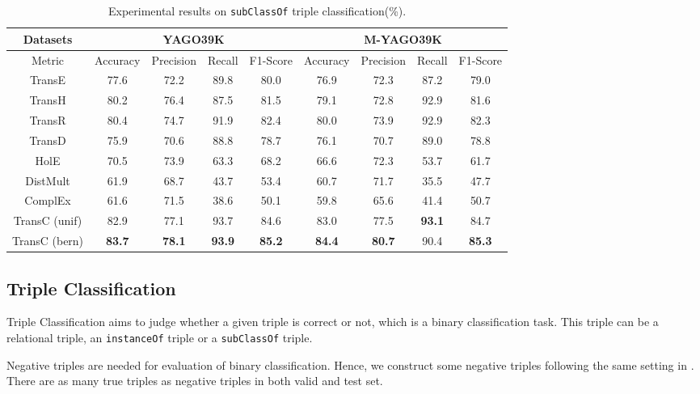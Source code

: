 \documentclass[11pt,a4paper]{article}
\begin{document}
  \begin{table*}[!htb]
    \centering
    \setlength{\belowcaptionskip}{-1pt}
    \small
        \begin{tabular}{c|cccc|cccc}
        \hline
        Datasets & \multicolumn{4}{c|}{YAGO39K} & \multicolumn{4}{c}{M-YAGO39K}\\
        \hline
        \multirow{1}{*}{Metric} & Accuracy & Precision & Recall & F1-Score & Accuracy & Precision & Recall & F1-Score \\
        \hline
        TransE  & 77.6  & 72.2  & 89.8   & 80.0 & 76.9  & 72.3  & 87.2   & 79.0   \\
        TransH  & 80.2  & 76.4   & 87.5   & 81.5  & 79.1  & 72.8   & 92.9   & 81.6 \\
        TransR  & 80.4  & 74.7   & 91.9   & 82.4  & 80.0  & 73.9   & 92.9   & 82.3 \\
        TransD  & 75.9  & 70.6   & 88.8   & 78.7   & 76.1  & 70.7   & 89.0   & 78.8\\
        HolE    & 70.5  & 73.9   & 63.3   & 68.2   & 66.6  & 72.3   & 53.7   & 61.7\\
        DistMult & 61.9  & 68.7   & 43.7   & 53.4   & 60.7  & 71.7   & 35.5   & 47.7\\
        ComplEx & 61.6  & 71.5   & 38.6   & 50.1   & 59.8  & 65.6   & 41.4   & 50.7\\
        \hline
        TransC (unif)  & 82.9  & 77.1   & 93.7   & 84.6  & 83.0  & 77.5   & \textbf{93.1}   & 84.7 \\
        TransC (bern)  & \textbf{83.7}  & \textbf{78.1}   & \textbf{93.9}   & \textbf{85.2}  & \textbf{84.4}  & \textbf{80.7}   & 90.4  & \textbf{85.3} \\
        \hline
        \end{tabular} 
        \caption{\label{table4}Experimental results on \texttt{subClassOf} triple classification(\%).}
    \end{table*}
  
  \subsection{Triple Classification}\label{triple classification}
  
  Triple Classification aims to judge whether a given triple is correct or not, which is a binary classification task. 
  This triple can be a relational triple, an \texttt{instanceOf} triple or a \texttt{subClassOf} triple. 
  
  Negative triples are needed for evaluation of binary classification. Hence, we construct some negative triples 
  following the same setting in \cite{NTN}. There are as many true triples as negative triples in 
  both valid and test set.
  
\end{document}
